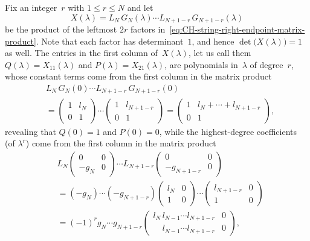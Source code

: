 \documentclass[10pt,a4paper]{article} \pdfoutput=1 
\begin{document}
Fix an integer~$r$ with $1 \le r \le N$ and let
\begin{equation}
  \label{eq:CH-matrix-product-even}
  X(\lambda) = L_N \, G_N(\lambda) \dotsm L_{N+1-r} \, G_{N+1-r}(\lambda)
\end{equation}
be the product of the leftmost $2r$ factors in~\eqref{eq:CH-string-right-endpoint-matrix-product}.
Note that each factor has determinant~$1$, and hence $\det\bigl( X(\lambda) \bigr) = 1$ as well.
The entries in the first column of~$X(\lambda)$,
let us call them $Q(\lambda) = X_{11}(\lambda)$ and $P(\lambda) = X_{21}(\lambda)$,
are polynomials in~$\lambda$ of degree~$r$,
whose constant terms come from the first column in the matrix product
\begin{equation*}
  \begin{split}
    &
    L_N \, G_N(0) \dotsm L_{N+1-r} \, G_{N+1-r}(0)
    \\ &
    =
    \begin{pmatrix} 1 & l_N \\ 0 & 1 \end{pmatrix}
    \dotsm
    \begin{pmatrix} 1 & l_{N+1-r} \\ 0 & 1 \end{pmatrix}
    = \begin{pmatrix} 1 & l_N + \dotsb + l_{N+1-r} \\ 0 & 1 \end{pmatrix}
    ,
  \end{split}
\end{equation*}
revealing that $Q(0)=1$ and $P(0)=0$,
while the highest-degree coefficients (of $\lambda^r$) come from the first column in the matrix product
\begin{equation*}
  \begin{split}
    &
    L_N
    \begin{pmatrix} 0 & 0 \\ -g_N & 0 \end{pmatrix}
    \dotsm
    L_{N+1-r}
    \begin{pmatrix} 0 & 0 \\ -g_{N+1-r} & 0 \end{pmatrix}
    \\ &
    = (-g_N) \dotsm (-g_{N+1-r})
    \begin{pmatrix} l_N & 0 \\ 1 & 0 \end{pmatrix}
    \dotsm
    \begin{pmatrix} l_{N+1-r} & 0 \\ 1 & 0 \end{pmatrix}
    \\ &
    = (-1)^r g_N \dotsm g_{N+1-r}
    \begin{pmatrix} l_N \, l_{N-1} \dotsm l_{N+1-r} & 0 \\ \phantom{l_N \,} l_{N-1} \dotsm l_{N+1-r} & 0 \end{pmatrix}
    ,
  \end{split}
\end{equation*}
\end{document}
